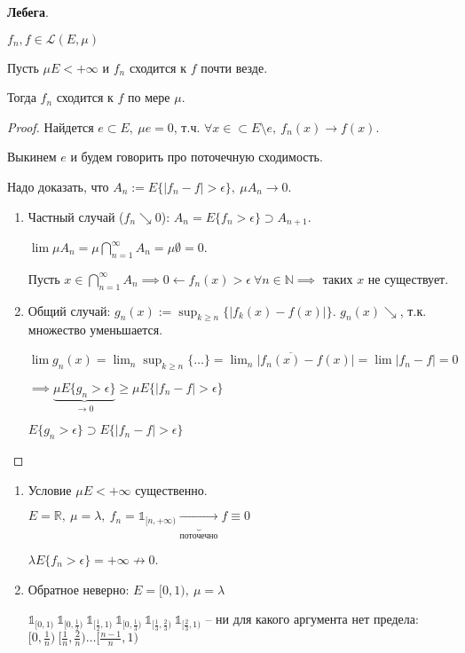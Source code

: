 \begin{theorem}
    \textbf{Лебега}.

    $f_n, f \in \mathcal{L}(E, \mu)$

    Пусть $\mu E < +\infty$ и $f_n$ сходится к $f$ почти везде.

    Тогда $f_n$ сходится к $f$ по мере $\mu$.
\end{theorem}
\begin{proof}
    Найдется $e \subset E, \ \mu e = 0$, т.ч. $\forall x \in \subset E \setminus e, \ f_n(x) \rightarrow f(x)$.

    Выкинем $e$ и будем говорить про поточечную сходимость.

    Надо доказать, что $A_n := E \{ |f_n - f| > \epsilon \}, \ \mu A_n \rightarrow 0$.

    \begin{enumerate}
        \item {
            Частный случай ($f_n \searrow 0$): $A_n = E \{ f_n > \epsilon \} \supset A_{n+1}$.

            $\lim{\mu A_n} = \mu \bigcap_{n=1}^{\infty} A_n = \mu \emptyset = 0$.
            
            Пусть $x \in \bigcap_{n=1}^{\infty} A_n \implies 0 \leftarrow f_n(x) > \epsilon \ \forall n \in \mathbb{N} \implies $ таких $x$ не существует.
        }
        \item {
            Общий случай: $g_n(x) := \sup_{k \geq n} \{ |f_k(x) - f(x)| \}$. $g_n(x) \searrow$, т.к. множество уменьшается.

            $\lim {g_n(x)} = \lim_{n} \sup_{k \geq n} \{ \dots \} = \overline{\lim_n {|f_n(x) - f(x)|}} = \lim {|f_n - f|} = 0$

            $\implies \underbrace{\mu E \{ g_n > \epsilon \}}_{\rightarrow 0} \geq \mu E \{ |f_n - f| > \epsilon \}$

            $E \{ g_n > \epsilon \} \supset E \{ |f_n - f| > \epsilon \}$
        }
    \end{enumerate}
\end{proof}


\begin{remark}
    \begin{enumerate}
        \item {
            Условие $\mu E < +\infty$ существенно.

            $E = \mathbb{R}, \ \mu = \lambda, \ f_n = \mathbb{1}_{[n, +\infty)} \underbrace{\rightarrow}_{\text{поточечно}} f \equiv 0$

            $\lambda E \{ f_n > \epsilon \} = +\infty \not \rightarrow 0$.
        }
        \item {
            Обратное неверно: $E = [0, 1), \ \mu = \lambda$

            $\mathbb{1}_{[0, 1)} \ \mathbb{1}_{[0, \frac{1}{2})} \ \mathbb{1}_{[\frac{1}{2}, 1)} \ \mathbb{1}_{[0, \frac{1}{3})} \ \mathbb{1}_{[\frac{1}{3}, \frac{2}{3})} \ \mathbb{1}_{[\frac{2}{3}, 1)}$ -- ни для какого аргумента нет предела: $[0, \frac{1}{n}) \ [\frac{1}{n}, \frac{2}{n}) \dots [\frac{n - 1}{n}, 1)$
        }
    \end{enumerate}
\end{remark}


